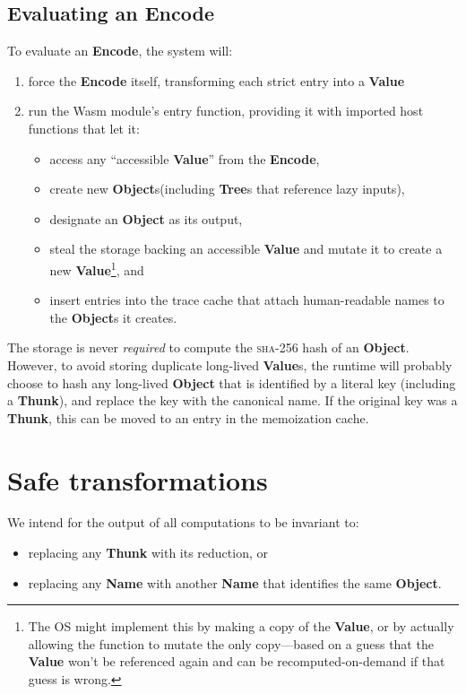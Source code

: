 \documentclass{article}
\newcommand{\valuex}{\textbf{Value}\xspace}
\newcommand{\valuexs}{\textbf{Value}s\xspace}
\newcommand{\object}{\textbf{Object}\xspace}
\newcommand{\objects}{\textbf{Object}s\xspace}
\newcommand{\encode}{\textbf{Encode}\xspace}
\newcommand{\thunk}{\textbf{Thunk}\xspace}
\newcommand{\name}{\textbf{Name}\xspace}
\newcommand{\trees}{\textbf{Tree}s\xspace}
\begin{document}
\subsection{Evaluating an \encode}

To evaluate an \encode, the system will:
\begin{enumerate}[itemsep=0pt]
\item force the \encode itself, transforming each strict entry into a \valuex
\item run the Wasm module's entry function, providing it with imported host functions that let it:
\begin{itemize}[itemsep=0pt, topsep=0pt]
\item access any ``accessible \valuex'' from the \encode,
\item create new \objects (including \trees that reference lazy inputs),
\item designate an \object as its output,
\item steal the storage backing an accessible \valuex and mutate it to create a new \valuex\footnote{The OS
might implement this by making a copy of the \valuex, or by actually allowing
the function to mutate the only copy---based on a guess that the \valuex won't be referenced
again and can be recomputed-on-demand if that guess is wrong.}, and
\item insert entries into the trace cache that attach human-readable names to the \objects it creates.
\end{itemize}
\end{enumerate}

The storage is never \emph{required} to compute the \textsc{sha-256} hash of an
\object. However, to avoid storing duplicate long-lived \valuexs, the
runtime will probably choose to hash any long-lived \object that is
identified by a literal key (including a \thunk), and replace the key
with the canonical name. If the original key was a \thunk, this can be
moved to an entry in the memoization cache.

\section{Safe transformations}

We intend for the output of all computations to be invariant to:

\begin{itemize}[itemsep=0pt]

\item replacing any \thunk with its reduction, or

\item replacing any \name with another \name that identifies the same \object.

\end{itemize}
\end{document}
